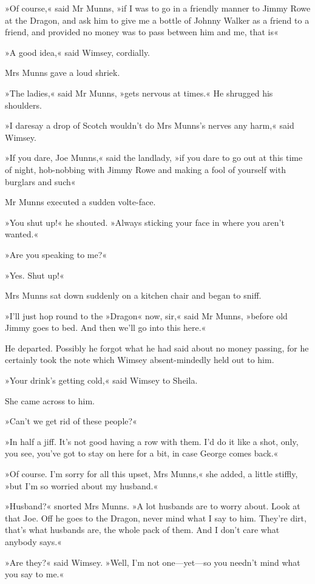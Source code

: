 »Of course,« said Mr Munns, »if I was to go in a friendly manner to Jimmy Rowe at the Dragon, and ask him to give me a bottle of Johnny Walker as a friend to a friend, and provided no money was to pass between him and me, that is\longdash«

»A good idea,« said Wimsey, cordially.

Mrs Munns gave a loud shriek.

»The ladies,« said Mr Munns, »gets nervous at times.« He shrugged his shoulders.

»I daresay a drop of Scotch wouldn't do Mrs Munns's nerves any harm,« said Wimsey.

»If you dare, Joe Munns,« said the landlady, »if you dare to go out at this time of night, hob-nobbing with Jimmy Rowe and making a fool of yourself with burglars and such\longdash«

Mr Munns executed a sudden volte-face.

»You shut up!« he shouted. »Always sticking your face in where you aren't wanted.«

»Are you speaking to me?«

»Yes. Shut up!«

Mrs Munns sat down suddenly on a kitchen chair and began to sniff.

»I'll just hop round to the »Dragon« now, sir,« said Mr Munns, »before old Jimmy goes to bed. And then we'll go into this here.«

He departed. Possibly he forgot what he had said about no money passing, for he certainly took the note which Wimsey absent-mindedly held out to him.

»Your drink's getting cold,« said Wimsey to Sheila.

She came across to him.

»Can't we get rid of these people?«

»In half a jiff. It's not good having a row with them. I'd do it like a shot, only, you see, you've got to stay on here for a bit, in case George comes back.«

»Of course. I'm sorry for all this upset, Mrs Munns,« she added, a little stiffly, »but I'm so worried about my husband.«

»Husband?« snorted Mrs Munns. »A lot husbands are to worry about. Look at that Joe. Off he goes to the Dragon, never mind what I say to him. They're dirt, that's what husbands are, the whole pack of them. And I don't care what anybody says.«

»Are they?« said Wimsey. »Well, I'm not one—yet—so you needn't mind what you say to me.«

